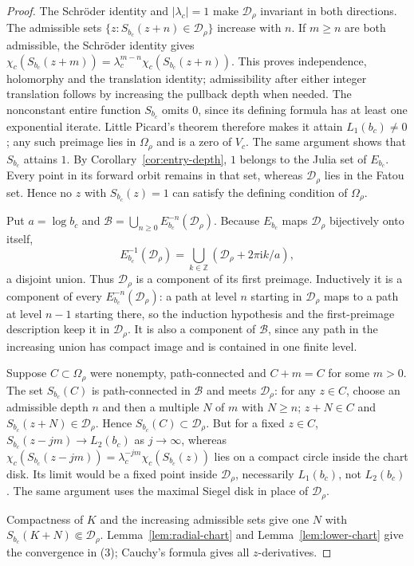 \documentclass[11pt]{amsart}
\theoremstyle{definition}
\newcommand{\ii}{\mathrm{i}}
\begin{document}
\begin{proof}
The Schr\"oder identity and $|\lambda_c|=1$ make
$\mathcal D_\rho$ invariant in both directions.  The admissible sets
$\{z:S_{b_c}(z+n)\in\mathcal D_\rho\}$ increase with $n$.
If $m\ge n$ are both admissible, the Schr\"oder identity gives
$\chi_c(S_{b_c}(z+m))=\lambda_c^{m-n}\chi_c(S_{b_c}(z+n))$.
This proves independence, holomorphy and the translation identity;
admissibility after either integer translation follows by increasing
the pullback depth when needed.  The nonconstant entire function $S_{b_c}$
omits $0$, since its defining formula has at least one exponential
iterate.  Little Picard's theorem therefore makes it attain
$L_1(b_c)\ne0$; any such preimage lies in $\Omega_\rho$ and is a zero
of $V_c$.  The same argument shows that $S_{b_c}$ attains $1$.
By Corollary~\ref{cor:entry-depth}, $1$ belongs to the Julia
set of $E_{b_c}$.  Every point in its forward orbit remains in that set,
whereas $\mathcal D_\rho$ lies in the Fatou set.  Hence no $z$ with
$S_{b_c}(z)=1$ can satisfy the defining condition of $\Omega_\rho$.

Put $a=\log b_c$ and
$\mathcal B=\bigcup_{n\ge0}E_{b_c}^{-n}(\mathcal D_\rho)$.
Because $E_{b_c}$ maps $\mathcal D_\rho$ bijectively onto itself,
\[
 E_{b_c}^{-1}(\mathcal D_\rho)
 =\bigcup_{k\in\mathbb Z}
    (\mathcal D_\rho+2\pi\ii k/a),
\]
a disjoint union.  Thus $\mathcal D_\rho$ is a component of its first
preimage.  Inductively it is a component of every
$E_{b_c}^{-n}(\mathcal D_\rho)$: a path at level $n$ starting in
$\mathcal D_\rho$ maps to a path at level $n-1$ starting there, so the
induction hypothesis and the first-preimage description keep it in
$\mathcal D_\rho$.  It is also a component of $\mathcal B$, since any
path in the increasing union has compact image and is contained in one
finite level.

Suppose $C\subset\Omega_\rho$ were nonempty, path-connected and
$C+m=C$ for some $m>0$.  The set $S_{b_c}(C)$ is path-connected in
$\mathcal B$ and meets $\mathcal D_\rho$: for any $z\in C$, choose an
admissible depth $n$ and then a multiple $N$ of $m$ with $N\ge n$;
$z+N\in C$ and $S_{b_c}(z+N)\in\mathcal D_\rho$.  Hence
$S_{b_c}(C)\subset\mathcal D_\rho$.  But for a fixed $z\in C$,
$S_{b_c}(z-jm)\to L_2(b_c)$ as $j\to\infty$, whereas
$\chi_c(S_{b_c}(z-jm))=\lambda_c^{-jm}\chi_c(S_{b_c}(z))$ lies on a
compact circle inside the chart disk.  Its limit would be a fixed
point inside $\mathcal D_\rho$, necessarily $L_1(b_c)$, not $L_2(b_c)$.
The same argument uses the maximal Siegel disk in place of
$\mathcal D_\rho$.

Compactness of $K$ and the increasing admissible sets give one $N$
with $S_{b_c}(K+N)\Subset\mathcal D_\rho$.  Lemma~\ref{lem:radial-chart} and
Lemma~\ref{lem:lower-chart} give the convergence in (3); Cauchy's
formula gives all $z$-derivatives.
\end{proof}
\end{document}
